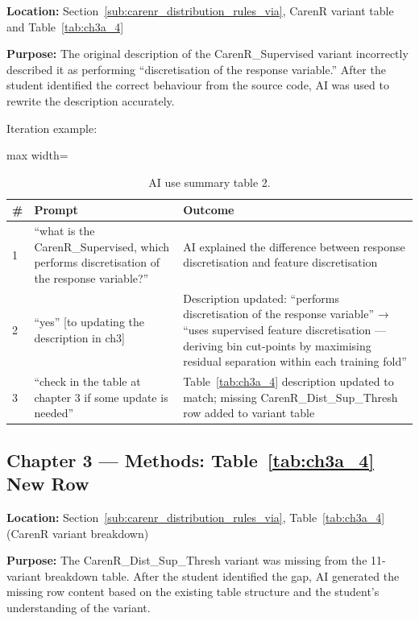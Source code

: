 \textbf{Location: }Section~\ref{sub:carenr_distribution_rules_via}, CarenR variant table and Table~\ref{tab:ch3a_4}

\textbf{Purpose: }The original description of the CarenR\_Supervised variant incorrectly described it as performing “discretisation of the response variable.” After the student identified the correct behaviour from the source code, AI was used to rewrite the description accurately.

Iteration example:

\begin{table}[htbp]
  \centering
  \caption{AI use summary table 2.}\label{tab:appe_2}
  \footnotesize
  \begin{adjustbox}{max width=\textwidth}
    \begin{tabularx}{\textwidth}{p{0.4cm}|p{5.0cm}|X}
  \toprule
  \# & Prompt & Outcome \\
  \midrule
  1 & ``what is the CarenR\_Supervised, which performs discretisation of the response variable?'' & AI explained the difference between response discretisation and feature discretisation \\
  2 & ``yes'' [to updating the description in ch3] & Description updated: “performs discretisation of the response variable” → “uses supervised feature discretisation --- deriving bin cut-points by maximising residual separation within each training fold” \\
  3 & ``check in the table at chapter 3 if some update is needed'' & Table~\ref{tab:ch3a_4} description updated to match; missing CarenR\_Dist\_Sup\_Thresh row added to variant table \\
  \bottomrule
\end{tabularx}
  \end{adjustbox}

\end{table}


\subsection{Chapter 3 --- Methods: Table~\ref{tab:ch3a_4} New Row}\label{app_sub:chapter_3_methods_table}

\textbf{Location: }Section~\ref{sub:carenr_distribution_rules_via}, Table~\ref{tab:ch3a_4} (CarenR variant breakdown)

\textbf{Purpose: }The CarenR\_Dist\_Sup\_Thresh variant was missing from the 11-variant breakdown table. After the student identified the gap, AI generated the missing row content based on the existing table structure and the student’s understanding of the variant.


